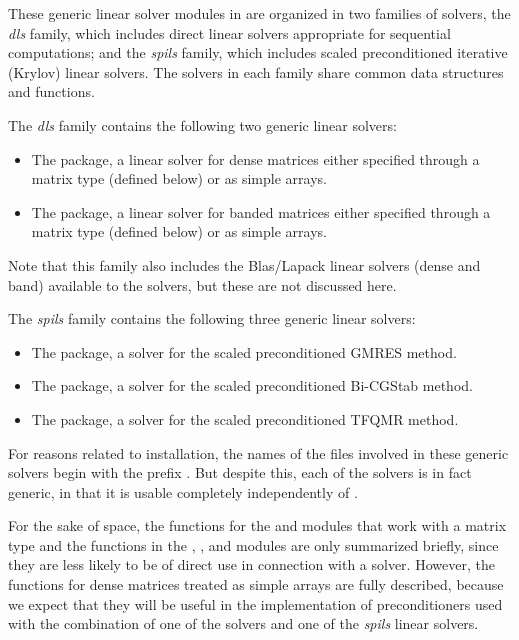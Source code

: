 These generic linear solver modules in {\sundials} are organized in
two families of solvers, the {\em dls} family, which includes direct
linear solvers appropriate for sequential computations; and the {\em spils}
family, which includes scaled preconditioned iterative (Krylov) linear solvers.
The solvers in each family share common data structures and functions.

The {\em dls} family contains the following two generic linear solvers:
\begin{itemize}
\item The {\dense} package, a linear solver for dense matrices either specified 
  through a matrix type (defined below) or as simple arrays.
\item The {\band} package, a linear solver for banded matrices either specified 
  through a matrix type (defined below) or as simple arrays.
\end{itemize}
Note that this family also includes the Blas/Lapack linear solvers (dense and band) 
available to the {\sundials} solvers, but these are not discussed here.

The {\em spils} family contains the following three generic linear solvers:
\begin{itemize}
\item The {\spgmr} package, a solver for the scaled preconditioned GMRES method.
\item The {\spbcg} package, a solver for the scaled preconditioned Bi-CGStab method.
\item The {\sptfqmr} package, a solver for the scaled preconditioned TFQMR method.
\end{itemize}

For reasons related to installation, the names of the files involved
in these generic solvers begin with the prefix .  But
despite this, each of the solvers is in fact generic, in that it is
usable completely independently of {\sundials}.

For the sake of space, the functions for the  and  modules
that work with a matrix type and the functions in the {\spgmr}, {\spbcg}, and {\sptfqmr}
modules are only summarized briefly, since they are less likely to be of direct use
in connection with a {\sundials} solver.  However, the functions for dense matrices 
treated as simple arrays are fully described, because we expect that they will be 
useful in the implementation of preconditioners used with the combination of one of
the {\sundials} solvers and one of the {\em spils} linear solvers.



